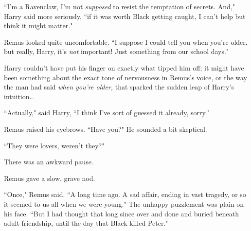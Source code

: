 ``I'm a Ravenclaw, I'm not \emph{supposed} to resist the temptation of secrets. And," Harry said more seriously, ``if it was worth Black getting caught, I can't help but think it might matter."

Remus looked quite uncomfortable. ``I suppose I could tell you when you're older, but really, Harry, it's \emph{not} important! Just something from our school days."

Harry couldn't have put his finger on exactly what tipped him off; it might have been something about the exact tone of nervousness in Remus's voice, or the way the man had said \emph{when you're older,} that sparked the sudden leap of Harry's intuition{\ldots}

``Actually," said Harry, ``I think I've sort of guessed it already, sorry."

Remus raised his eyebrows. ``Have you?" He sounded a bit skeptical.

``They were lovers, weren't they?"

There was an awkward pause.

Remus gave a slow, grave nod.

``Once," Remus said. ``A long time ago. A sad affair, ending in vast tragedy, or so it seemed to us all when we were young." The unhappy puzzlement was plain on his face. ``But I had thought that long since over and done and buried beneath adult friendship, until the day that Black killed Peter."

